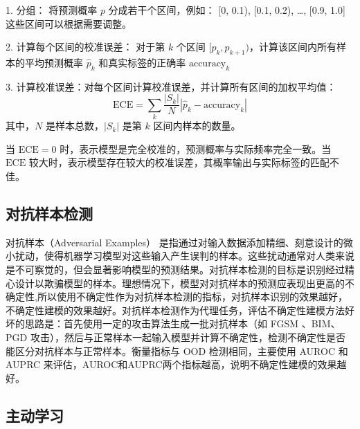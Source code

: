 1. 分组：
   将预测概率 \( p \) 分成若干个区间，例如： [0, 0.1), [0.1, 0.2), \dots, [0.9, 1.0] 这些区间可以根据需要调整。

2. 计算每个区间的校准误差：
   对于第 \( k \) 个区间 \( [p_k, p_{k+1}) \)，计算该区间内所有样本的平均预测概率 \( \hat{p}_k \) 和真实标签的正确率 \( \text{accuracy}_k \)

3. 计算校准误差：对每个区间计算校准误差，并计算所有区间的加权平均值：
\[
   \text{ECE} = \sum_k \frac{|S_k|}{N} | \hat{p}_k - \text{accuracy}_k |
   \]
   其中，\( N \) 是样本总数，\( |S_k| \) 是第 \( k \) 区间内样本的数量。


当 \(\text{ECE} = 0\) 时，表示模型是完全校准的，预测概率与实际频率完全一致。当 \(\text{ECE}\) 较大时，表示模型存在较大的校准误差，其概率输出与实际标签的匹配不佳。





\subsection{对抗样本检测}

对抗样本（Adversarial Examples） 是指通过对输入数据添加精细、刻意设计的微小扰动，使得机器学习模型对这些输入产生误判的样本。这些扰动通常对人类来说是不可察觉的，但会显著影响模型的预测结果。对抗样本检测的目标是识别经过精心设计以欺骗模型的样本。理想情况下，模型对对抗样本的预测应表现出更高的不确定性,所以使用不确定性作为对抗样本检测的指标，对抗样本识别的效果越好，不确定性建模的效果越好。对抗样本检测作为代理任务，评估不确定性建模方法好坏的思路是：首先使用一定的攻击算法生成一批对抗样本（如 FGSM\cite{goodfellow2015explaining} 、BIM\cite{kurakin2016adversarial}、PGD\cite{madry2017towards} 攻击），然后与正常样本一起输入模型并计算不确定性，检测不确定性是否能区分对抗样本与正常样本。衡量指标与 OOD 检测相同，主要使用 AUROC 和 AUPRC 来评估，AUROC和AUPRC两个指标越高，说明不确定性建模的效果越好。


\subsection{主动学习}


